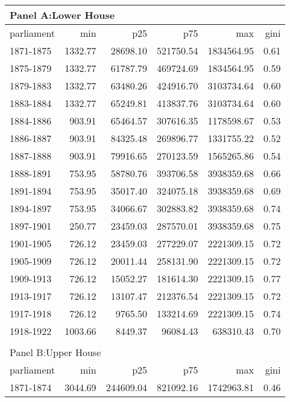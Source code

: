 \begin{table}[ht]
\centering
\begin{tabular}{lrrrrr}
   
\multicolumn{6}{l}{Panel A:Lower House}\\ 
\hline
parliament & min & p25 & p75 & max & gini \\\hline

1871-1875 & 1332.77 & 28698.10 & 521750.54 & 1834564.95 & 0.61 \\ 
  1875-1879 & 1332.77 & 61787.79 & 469724.69 & 1834564.95 & 0.59 \\ 
  1879-1883 & 1332.77 & 63480.26 & 424916.70 & 3103734.64 & 0.60 \\ 
  1883-1884 & 1332.77 & 65249.81 & 413837.76 & 3103734.64 & 0.60 \\ 
  1884-1886 & 903.91 & 65464.57 & 307616.35 & 1178598.67 & 0.53 \\ 
  1886-1887 & 903.91 & 84325.48 & 269896.77 & 1331755.22 & 0.52 \\ 
  1887-1888 & 903.91 & 79916.65 & 270123.59 & 1565265.86 & 0.54 \\ 
  1888-1891 & 753.95 & 58780.76 & 393706.58 & 3938359.68 & 0.66 \\ 
  1891-1894 & 753.95 & 35017.40 & 324075.18 & 3938359.68 & 0.69 \\ 
  1894-1897 & 753.95 & 34066.67 & 302883.82 & 3938359.68 & 0.74 \\ 
  1897-1901 & 250.77 & 23459.03 & 287570.01 & 3938359.68 & 0.75 \\ 
  1901-1905 & 726.12 & 23459.03 & 277229.07 & 2221309.15 & 0.72 \\ 
  1905-1909 & 726.12 & 20011.44 & 258131.90 & 2221309.15 & 0.72 \\ 
  1909-1913 & 726.12 & 15052.27 & 181614.30 & 2221309.15 & 0.77 \\ 
  1913-1917 & 726.12 & 13107.47 & 212376.54 & 2221309.15 & 0.72 \\ 
  1917-1918 & 726.12 & 9765.50 & 133214.69 & 2221309.15 & 0.74 \\ 
  1918-1922 & 1003.66 & 8449.37 & 96084.43 & 638310.43 & 0.70 \\ 
   \hline\\ 
\multicolumn{6}{l}{Panel B:Upper House}\\ 
\hline
parliament & min & p25 & p75 & max & gini \\\hline
1871-1874 & 3044.69 & 244609.04 & 821092.16 & 1742963.81 & 0.46 \\ 

\end{tabular}
\end{table}
